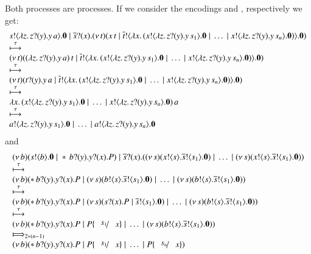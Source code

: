 Both processes are \HOp processes.
If we consider the encodings \HO and \sessp, respectively
we get:
\[
\begin{array}{l}
	s ! \langle \lambda z.\,z ? (y) . y\, {a} \rangle . \mathbf{0} \;|\; \overline{s} ? (x) . (\nu\, t)(x\, {t} \;|\; \overline{t} ! \langle \lambda x.\,(x ! \langle \lambda z.\,z ? (y) . y\, {s_1} \rangle . \mathbf{0} \;|\; \dots \;|\; x ! \langle \lambda z.\,z ? (y) . y\, {s_n} \rangle . \mathbf{0}) \rangle . \mathbf{0})\\
	\stackrel{\tau}{\longmapsto}\\
	(\nu\, t)((\lambda z.\,z ? (y) . y\, {a})\, {t} \;|\; \overline{t} ! \langle \lambda x.\,(x ! \langle \lambda z.\,z ? (y) . y\, {s_1} \rangle . \mathbf{0} \;|\; \dots \;|\; x ! \langle \lambda z.\,z ? (y) . y\, {s_n} \rangle . \mathbf{0}) \rangle . \mathbf{0})\\
	\stackrel{\tau}{\longmapsto}\\
	(\nu\, t)(t ? (y) . y\, {a} \;|\; \overline{t} ! \langle \lambda x.\,(x ! \langle \lambda z.\,z ? (y) . y\, {s_1} \rangle . \mathbf{0} \;|\; \dots \;|\; x ! \langle \lambda z.\,z ? (y) . y\, {s_n} \rangle . \mathbf{0}) \rangle . \mathbf{0})\\
	\stackrel{\tau}{\longmapsto}\\
	\lambda x.\,(x ! \langle \lambda z.\,z ? (y) . y\, {s_1} \rangle . \mathbf{0} \;|\; \dots \;|\; x ! \langle \lambda z.\,z ? (y) . y\, {s_n} \rangle . \mathbf{0})\, {a}
	\\
	\stackrel{\tau}{\longmapsto}
	\\
	a ! \langle \lambda z.\,z ? (y) . y\, {s_1} \rangle . \mathbf{0} \;|\; \dots \;|\; a ! \langle \lambda z.\,z ? (y) . y\, {s_n} \rangle . \mathbf{0}
\end{array}
\]
and 
\[
\begin{array}{l}
	\newsp{b}{\bout{s}{b} \inact \Par \repl \binp{b}{y} \binp{y}{x} P} \Par \binp{\dual{s}}{x} (\newsp{s}{\bout{x}{s} \bout{\dual{s}}{s_1} \inact} \Par \dots \Par \newsp{s}{\bout{x}{s} \bout{\dual{s}}{s_1}\inact})
	\\
	\hby{\tau}
	\\
	\newsp{b}{\repl \binp{b}{y} \binp{y}{x} P \Par \newsp{s}{\bout{b}{s} \bout{\dual{s}}{s_1} \inact} \Par \dots \Par \newsp{s}{\bout{b}{s} \bout{\dual{s}}{s_1} \inact}}
	\\
	\hby{\tau}
	\\
	\newsp{b}{\repl \binp{b}{y} \binp{y}{x} P \Par \newsp{s}{\binp{s}{x} P \Par \bout{\dual{s}}{s_1} \inact} \Par \dots \Par \newsp{s}{\bout{b}{s} \bout{\dual{s}}{s_1} \inact}}
	\\
	\hby{\tau}
	\\
	\newsp{b}{\repl \binp{b}{y} \binp{y}{x} P \Par P\subst{s_1}{x} \Par \dots \Par \newsp{s}{\bout{b}{s} \bout{\dual{s}}{s_1} \inact}}
	\\
	\Hby{}_{2*(n - 1)}
	\\
	\newsp{b}{\repl \binp{b}{y} \binp{y}{x} P \Par P\subst{s_1}{x} \Par \dots \Par P\subst{s_n}{x}}
	
\end{array}
\]



